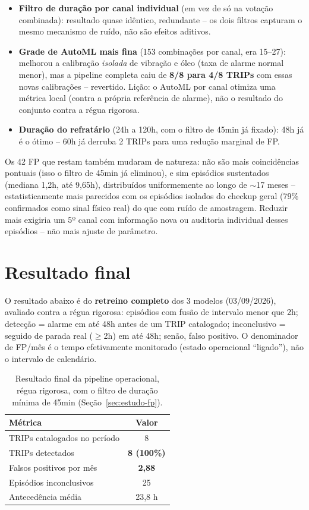 \documentclass[11pt,a4paper]{article}
\begin{document}
\begin{itemize}
  \item \textbf{Filtro de duração por canal individual} (em vez de só
    na votação combinada): resultado quase idêntico, redundante --
    os dois filtros capturam o mesmo mecanismo de ruído, não são
    efeitos aditivos.
  \item \textbf{Grade de AutoML mais fina} (153 combinações por
    canal, era 15--27): melhorou a calibração \emph{isolada} de
    vibração e óleo (taxa de alarme normal menor), mas a pipeline
    completa caiu de \textbf{8/8 para 4/8 TRIPs} com essas novas
    calibrações -- revertido. Lição: o AutoML por canal otimiza uma
    métrica local (contra a própria referência de alarme), não o
    resultado do conjunto contra a régua rigorosa.
  \item \textbf{Duração do refratário} (24h a 120h, com o filtro de
    45min já fixado): 48h já é o ótimo -- 60h já derruba 2 TRIPs para
    uma redução marginal de FP.
\end{itemize}

Os 42 FP que restam também mudaram de natureza: não são mais
coincidências pontuais (isso o filtro de 45min já eliminou), e sim
episódios sustentados (mediana 1,2h, até 9,65h), distribuídos
uniformemente ao longo de $\sim$17 meses -- estatisticamente mais
parecidos com os episódios isolados do checkup geral (79\%
confirmados como sinal físico real) do que com ruído de amostragem.
Reduzir mais exigiria um 5º canal com informação nova ou auditoria
individual desses episódios -- não mais ajuste de parâmetro.

\section{Resultado final}
\label{sec:resultado}

O resultado abaixo é do \textbf{retreino completo} dos 3 modelos
(03/09/2026), avaliado contra a régua rigorosa: episódios com
fusão de intervalo menor que 2h; detecção = alarme em até 48h antes
de um TRIP catalogado; inconclusivo = seguido de parada real
($\geq$2h) em até 48h; senão, falso positivo. O denominador de
FP/mês é o tempo efetivamente monitorado (estado operacional
``ligado''), não o intervalo de calendário.

\begin{table}[H]
\centering
\begin{tabular}{lc}
\toprule
\textbf{Métrica} & \textbf{Valor} \\
\midrule
TRIPs catalogados no período & 8 \\
TRIPs detectados & \textbf{8 (100\%)} \\
Falsos positivos por mês & \textbf{2,88} \\
Episódios inconclusivos & 25 \\
Antecedência média & 23,8 h \\
\bottomrule
\end{tabular}
\caption{Resultado final da pipeline operacional, régua rigorosa, com
o filtro de duração mínima de 45min (Seção~\ref{sec:estudo-fp}).}
\end{table}
\end{document}
